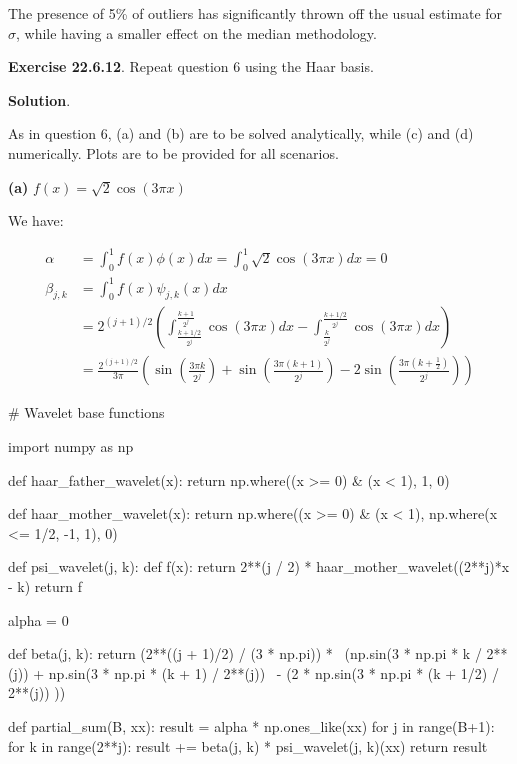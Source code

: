 The presence of 5\% of outliers has significantly thrown off the usual
estimate for \(\sigma\), while having a smaller effect on the median
methodology.

\textbf{Exercise 22.6.12}. Repeat question 6 using the Haar basis.

\textbf{Solution}.

As in question 6, (a) and (b) are to be solved analytically, while (c)
and (d) numerically. Plots are to be provided for all scenarios.

\textbf{(a)} \(f(x) = \sqrt{2} \cos (3 \pi x)\)

We have:

\begin{align*}
\alpha &= \int_{0}^{1} f(x) \phi(x) dx = \int_{0}^{1} \sqrt{2} \cos (3 \pi x) dx = 0 \\
\beta_{j, k} &= \int_{0}^{1} f(x) \psi_{j, k}(x) dx \\
&= 2^{(j + 1)/2} \left( \int_{\frac{k + 1/2}{2^{j}}}^{\frac{k + 1}{2^{j}}} \cos(3 \pi x) dx - \int_{\frac{k}{2^{j}}}^{\frac{k + 1/2}{2^{j}}} \cos(3 \pi x) dx \right) \\
&= \frac{2^{(j + 1)/2}}{3 \pi} \left(
 \sin\left( \frac{3\pi k}{2^{j}} \right)
 + \sin\left( \frac{3\pi (k + 1)}{2^{j}} \right)
 -  2 \sin\left( \frac{3\pi \left(k + \frac{1}{2}\right)}{2^{j}} \right) 
\right)
\end{align*}

\begin{python}
# Wavelet base functions

import numpy as np

def haar_father_wavelet(x):
    return np.where((x >= 0) & (x < 1), 1, 0)

def haar_mother_wavelet(x):
    return np.where((x >= 0) & (x < 1), np.where(x <= 1/2, -1, 1), 0)

def psi_wavelet(j, k):
    def f(x):
        return 2**(j / 2) * haar_mother_wavelet((2**j)*x - k)
    return f
\end{python}

\begin{python}
alpha = 0

def beta(j, k):
    return (2**((j + 1)/2) / (3 * np.pi)) *  \
            (np.sin(3 * np.pi * k / 2**(j)) + np.sin(3 * np.pi * (k + 1) / 2**(j)) \
             - (2 * np.sin(3 * np.pi * (k + 1/2) / 2**(j)) ))

def partial_sum(B, xx):
    result = alpha * np.ones_like(xx)
    for j in range(B+1):
        for k in range(2**j):
            result += beta(j, k) * psi_wavelet(j, k)(xx)
    return result
\end{python}

